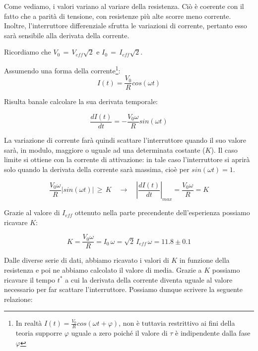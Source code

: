 Come vediamo, i valori variano al variare della resistenza. Ciò è coerente con il fatto che a parità di tensione, con resistenze più alte scorre meno corrente. Inoltre, l'interruttore differenziale sfrutta le variazioni di corrente, pertanto esso sarà sensibile alla derivata della corrente.

\noindent Ricordiamo che $V_0 \, = \, V_{eff} \sqrt{2}$ e $I_0 \, = \, I_{eff} \sqrt{2}$.

Assumendo una forma della corrente\footnote{In realtà $I(t)=\frac{V_0}{R}cos(\omega t + \varphi)$, non è tuttavia restrittivo ai fini della teoria supporre $\varphi$ uguale a zero poiché il valore di $\tau$ è indipendente dalla fase $\varphi$}:
\begin{equation}
I(t)=\frac{V_0}{R}cos(\omega t)
\label{eq:corrente}
\end{equation}

Risulta banale calcolare la sua derivata temporale:

\begin{equation}
\frac{dI(t)}{dt}=-\frac{V_0 \omega}{R}sin(\omega t)
\label{eq:derivata}
\end{equation}

\noindent La variazione di corrente farà quindi scattare l'interruttore quando il suo valore sarà, in modulo, maggiore o uguale ad una determinata costante ($K$). Il caso limite si ottiene con la corrente di attivazione: in tale caso l'interruttore si aprirà solo quando la derivata della corrente sarà massima, cioè per $sin(\omega t) = 1$.

\begin{equation*}
\frac{V_0 \omega}{R}|sin(\omega t)| \, \geq \, K	\quad \longrightarrow  \quad	
\left\vert \frac{dI(t)}{dt} \right\vert_{max} = \frac{V_0 \omega}{R} = K
\label{eq:max}
\end{equation*}

\noindent Grazie al valore di $I_{eff}$ ottenuto nella parte precendente dell'esperienza possiamo ricavare $K$:

\begin{equation}
K = \frac{V_0 \omega}{R} = I_0 \,\omega = \sqrt{2}\,I_{eff} \,\omega  = 11.8 \pm 0.1
\label{eq:K}
\end{equation}

\noindent Dalle diverse serie di dati, abbiamo ricavato i valori di $K$ in funzione della resistenza e poi ne abbiamo calcolato il valore di media. Grazie a $K$ possiamo ricavare il tempo $t^*$ a cui la derivata della corrente diventa uguale al valore necessario per far scattare l'interruttore. Possiamo dunque scrivere la seguente relazione:

